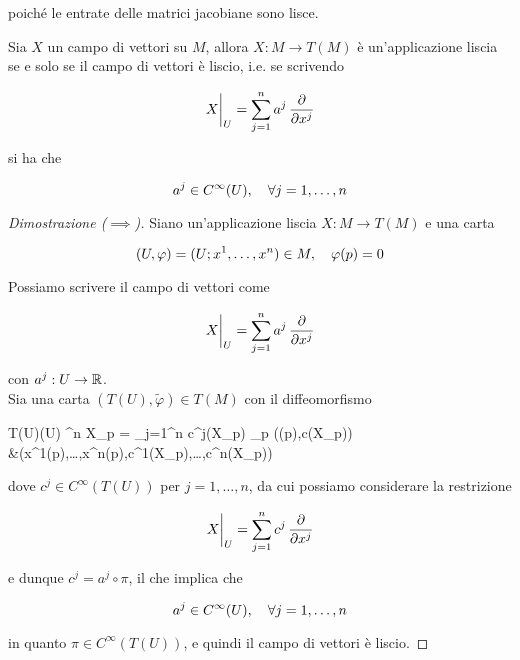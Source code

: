 poiché le entrate delle matrici jacobiane sono lisce.

\begin{definition}
	Sia $ X $ un campo di vettori su $ M $, allora $ X : M \to T(M) $ è un'applicazione liscia se e solo se il campo di vettori è liscio, i.e. se scrivendo
	
	\begin{equation}
		\eval{X}_{U} = \sum_{j=1}^{n} a^{j} \, \pdv{x^{j}}
	\end{equation}

	si ha che
	
	\begin{equation}
		a^{j} \in C^{\infty}(U) \qcomma \forall j=1,\dots,n
	\end{equation}
\end{definition}

\begin{proof}[Dimostrazione ($ \implies $)]
	Siano un'applicazione liscia $ X : M \to T(M) $ e una carta
	
	\begin{equation}
		(U,\varphi) = (U; x^{1},\dots,x^{n}) \in M \qcomma \varphi(p) = 0
	\end{equation}
	
	Possiamo scrivere il campo di vettori come
	
	\begin{equation}
		\eval{X}_{U} = \sum_{j=1}^{n} a^{j} \, \pdv{x^{j}}
	\end{equation}

	con $ a^{j} : U \to \mathbb{R} $. \\
	Sia una carta $ (T(U),\tilde{\varphi}) \in T(M) $ con il diffeomorfismo
	
	\map{\tilde{\varphi}}
		{T(U)}{\varphi(U) \times \R^{n}}
		{%
			X_{p} = \sum_{j=1}^{n} c^{j}(X_{p}) _{p}
			}
		{%
			(\varphi(p),c(X_{p})) \\
			&\mapsto (x^{1}(p),\dots,x^{n}(p),c^{1}(X_{p}),\dots,c^{n}(X_{p}))
			}

	dove $ c^{j} \in C^{\infty}(T(U)) $ per $ j=1,\dots,n $, da cui possiamo considerare la restrizione
	
	\begin{equation}
		\eval{X}_{U} = \sum_{j=1}^{n} c^{j} \, \pdv{x^{j}}
	\end{equation}

	e dunque $ c^{j} = a^{j} \circ \pi $, il che implica che
	
	\begin{equation}
		a^{j} \in C^{\infty}(U) \qcomma \forall j=1,\dots,n
	\end{equation}
	
	in quanto $ \pi \in C^{\infty}(T(U)) $, e quindi il campo di vettori è liscio.
\end{proof}

